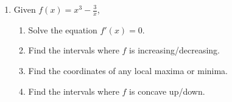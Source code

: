 \documentclass[12pt]{article}
\newcommand{\di}{\displaystyle}
\begin{document}
\begin{enumerate}
\vspace{3in}

\item Given $\di f(x) = x^3-\frac{3}{x}$,
\begin{enumerate}
\item Solve the equation $f'(x)=0$.

\vspace{2.5cm}

\item Find the intervals where $f$ is increasing/decreasing.

\vspace{2cm}

\item Find the coordinates of any local maxima or minima.

\vspace{2cm}


\item Find the intervals where $f$ is concave up/down.


\end{enumerate}
\end{enumerate}
\end{document}
